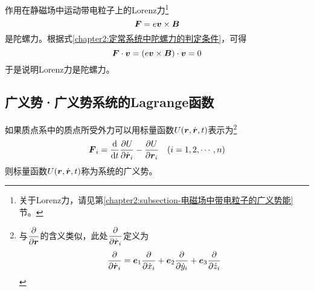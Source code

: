 \begin{example}
作用在静磁场中运动带电粒子上的Lorenz力\footnote{关于Lorenz力，请见第\ref{chapter2:subsection-电磁场中带电粒子的广义势能}节。}
\begin{equation*}
	\boldsymbol{F} = e\boldsymbol{v}\times \boldsymbol{B}
\end{equation*}
是陀螺力。根据式\eqref{chapter2:定常系统中陀螺力的判定条件}，可得
\begin{equation*}
	\boldsymbol{F} \cdot \boldsymbol{v} = (e\boldsymbol{v}\times \boldsymbol{B})\cdot \boldsymbol{v} = 0
\end{equation*}
于是说明Lorenz力是陀螺力。
\end{example}



\subsection{广义势·广义势系统的Lagrange函数}

如果质点系中的质点所受外力可以用标量函数$U(\boldsymbol{r},\dot{\boldsymbol{r}},t)$表示为\footnote{与$\dfrac{\partial}{\partial \boldsymbol{r}}$的含义类似，此处$\dfrac{\partial}{\partial \dot{\boldsymbol{r}}_i}$定义为\begin{equation*} \frac{\partial}{\partial \dot{\boldsymbol{r}}_i} = \boldsymbol{e}_1 \frac{\partial}{\partial \dot{x}_i} + \boldsymbol{e}_2 \frac{\partial}{\partial \dot{y}_i} + \boldsymbol{e}_3 \frac{\partial}{\partial \dot{z}_i} \end{equation*}}
\begin{equation}
	\boldsymbol{F}_i = \frac{\mathrm{d}}{\mathrm{d} t} \frac{\partial U}{\partial \dot{\boldsymbol{r}}_i} - \frac{\partial U}{\partial \boldsymbol{r}_i}\quad (i = 1,2,\cdots,n)
	\label{广义势关系}
\end{equation}
则标量函数$U(\boldsymbol{r},\dot{\boldsymbol{r}},t)$称为系统的{\heiti 广义势}。

